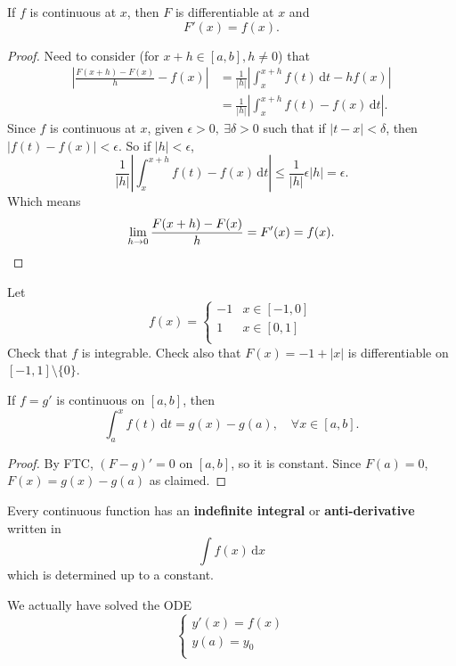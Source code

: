 \begin{theorem}[FTC]\label{thm:5.8}
    If $f$ is continuous at $x$, then $F$ is differentiable at $x$ and
    \[
        F'(x)=f(x).
    \] 
\end{theorem}
\begin{proof}
    Need to consider (for $ x+h\in [a,b],h\neq 0 $) that
    \begin{align*}
        \left| \frac{F(x+h)-F(x)}{h}-f(x) \right|&= \frac{1}{|h|}\left| \int_{x}^{x+h} f(t) \,\mathrm{d}t - h f(x) \right| \\ 
        &= \frac{1}{|h|} \left| \int_{x}^{x+h} f(t)-f(x) \,\mathrm{d}t \right| .
    \end{align*}
    Since $f$ is continuous at $x$, given $ \epsilon>0,\ \exists \delta>0  $ such that if $ |t-x|<\delta $, then $ |f(t)-f(x)|<\epsilon$. So if $ |h|<\epsilon $, 
    \[
        \frac{1}{|h|} \left| \int_{x}^{x+h} f(t)-f(x) \,\mathrm{d}t \right|\le \frac{1}{|h|} \epsilon |h| = \epsilon.
    \]
    Which means 
    \[
        \lim_{h \to 0} \frac{F(x+h)-F(x)}{h} = F'(x) = f(x).\qedhere
    \]
\end{proof}
\begin{example}
    Let 
    \[
        f(x) = \begin{cases}
        -1 &x\in [-1,0]\\
        1 &x\in [0,1]\\
        \end{cases} 
    \]
    Check that $f$ is integrable. Check also that $F(x)=-1+|x|$ is differentiable on $ [-1,1]\setminus \{0\} $.
\end{example}
\begin{corollary}
    If $f=g'$ is continuous on $[a,b]$, then 
    \[
        \int_{a}^{x} f(t) \,\mathrm{d}t = g(x)-g(a),\quad \forall x\in [a,b].
    \]
\end{corollary}
\begin{proof}
    By FTC, $(F-g)'=0$ on $ [a,b] $, so it is constant. Since $F(a)=0$, $ F(x)=g(x)-g(a) $ as claimed.
\end{proof}

\begin{note}
    Every continuous function has an \textbf{indefinite integral} or \textbf{anti-derivative} written in 
    \[
        \int f(x) \,\mathrm{d}x
    \]
    which is determined up to a constant.
\end{note}
\begin{remark}
    We actually have solved the ODE 
    \[
        \begin{cases}
         y'(x)=f(x)\\
         y(a)=y_0\\
        \end{cases}
    \]
\end{remark}